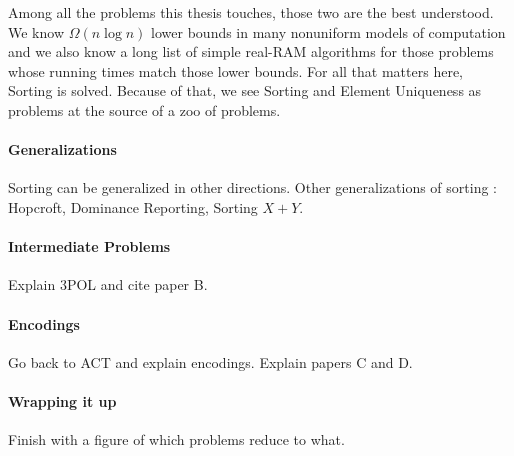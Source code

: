 Among all the problems this thesis touches, those two are the best understood.
We know \(\Omega(n \log n)\) lower bounds in many nonuniform models of
computation and we also know a long list of simple real-RAM algorithms for
those problems whose running times match those lower bounds. For all that
matters here, Sorting is solved.
%
Because of that, we see Sorting and Element Uniqueness as problems at the
source of a zoo of problems.


\paragraph{Generalizations}
Sorting can be generalized in other directions.
Other generalizations of sorting : Hopcroft, Dominance Reporting, Sorting \(X+Y\).

\paragraph{Intermediate Problems} Explain 3POL and cite paper B.

\paragraph{Encodings}
Go back to ACT and explain encodings. Explain papers C and D.

\paragraph{Wrapping it up}

Finish with a figure of which problems reduce to what.
